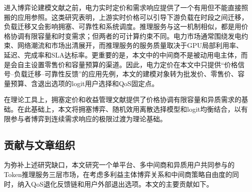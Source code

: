 \documentclass[UTF8,11pt]{ctexart}
\begin{document}
进入博弈论建模文献之前，电力实时定价和需求响应提供了一个有用但不能直接照搬的应用参照\cite{schweppe1988spot,borenstein2005long,albadi2008summary,faruqui2010household,siano2014demand}。这类研究表明，上游实时价格可以引导下游负载在时段之间迁移，负载迁移又会影响拥塞、可靠性和系统调度。推理服务与这一机制相似，都是用价格协调有限容量和时变需求；但两者的可计算约束不同。电力市场通常围绕发电约束、网络潮流和市场出清展开，而推理服务的服务质量取决于GPU局部利用率、延迟、完成率和SLA达标率。更重要的是，本文中的中间商不是被动用电主体，而是会自主设置零售价和容量预算的渠道。因此，电力定价在本文中只提供“价格信号--负载迁移--可靠性反馈”的应用先例，本文的建模对象转为批发价、零售价、容量预算、含退出选项的logit用户选择和QoS固定点。

在理论工具上，拥塞定价和收益管理文献提供了价格协调有限容量和异质需求的基础\cite{vickrey1969congestion,gallego1994dynamic,elmaghraby2003dynamic,bitran2003overview,talluri2004revenue,phillips2005pricing}。在此基础上，本文将拥塞博弈、随机效用离散选择模型和logit均衡结合，以有限参与者博弈到连续需求响应的极限过渡为理论基础\cite{rosenthal1973class,monderer1996potential,wardrop1952some,sandholm2010population,mcfadden1974conditional,train2009discrete}。

\subsection{贡献与文章组织}

为弥补上述研究缺口，本文研究一个单平台、多中间商和异质用户共同参与的Token推理服务三层市场，在考虑多利益主体博弈关系和中间商策略自由度的同时，纳入QoS退化反馈链和用户外部退出选项。本文的主要贡献如下。
\end{document}
